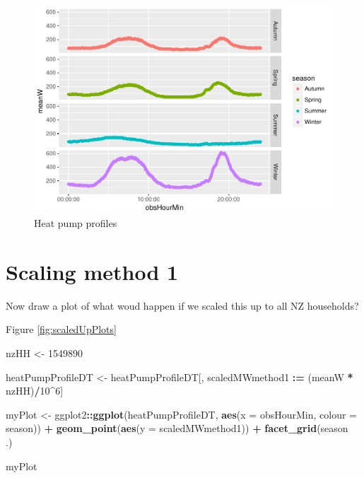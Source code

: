 \documentclass[]{article}
\newenvironment{Shaded}{\begin{snugshade}}{\end{snugshade}}
\newcommand{\KeywordTok}[1]{\textcolor[rgb]{0.13,0.29,0.53}{\textbf{#1}}}
\newcommand{\DataTypeTok}[1]{\textcolor[rgb]{0.13,0.29,0.53}{#1}}
\newcommand{\DecValTok}[1]{\textcolor[rgb]{0.00,0.00,0.81}{#1}}
\newcommand{\StringTok}[1]{\textcolor[rgb]{0.31,0.60,0.02}{#1}}
\newcommand{\OperatorTok}[1]{\textcolor[rgb]{0.81,0.36,0.00}{\textbf{#1}}}
\newcommand{\ErrorTok}[1]{\textcolor[rgb]{0.64,0.00,0.00}{\textbf{#1}}}
\newcommand{\NormalTok}[1]{#1}
\begin{document}
\begin{figure}
\centering
\includegraphics{heatPumpProfileAnalysis_files/figure-latex/profilePlot-1.pdf}
\caption{\label{fig:profilePlot}Heat pump profiles}
\end{figure}

\section{Scaling method 1}\label{scaling-method-1}

Now draw a plot of what woud happen if we scaled this up to all NZ
households?

Figure \ref{fig:scaledUpPlots}

\begin{Shaded}
\begin{Highlighting}[]
\NormalTok{nzHH <-}\StringTok{ }\DecValTok{1549890}

\NormalTok{heatPumpProfileDT <-}\StringTok{ }\NormalTok{heatPumpProfileDT[, scaledMWmethod1 }\OperatorTok{:}\ErrorTok{=}\StringTok{ }\NormalTok{(meanW }\OperatorTok{*}\StringTok{ }\NormalTok{nzHH)}\OperatorTok{/}\DecValTok{10}\OperatorTok{^}\DecValTok{6}\NormalTok{]}

\NormalTok{myPlot <-}\StringTok{ }\NormalTok{ggplot2}\OperatorTok{::}\KeywordTok{ggplot}\NormalTok{(heatPumpProfileDT, }\KeywordTok{aes}\NormalTok{(}\DataTypeTok{x =}\NormalTok{ obsHourMin, }\DataTypeTok{colour =}\NormalTok{ season)) }\OperatorTok{+}
\StringTok{  }\KeywordTok{geom_point}\NormalTok{(}\KeywordTok{aes}\NormalTok{(}\DataTypeTok{y =}\NormalTok{ scaledMWmethod1)) }\OperatorTok{+}
\StringTok{  }\KeywordTok{facet_grid}\NormalTok{(season }\OperatorTok{~}\StringTok{ }\NormalTok{.)}

\NormalTok{myPlot}
\end{Highlighting}
\end{Shaded}
\end{document}
